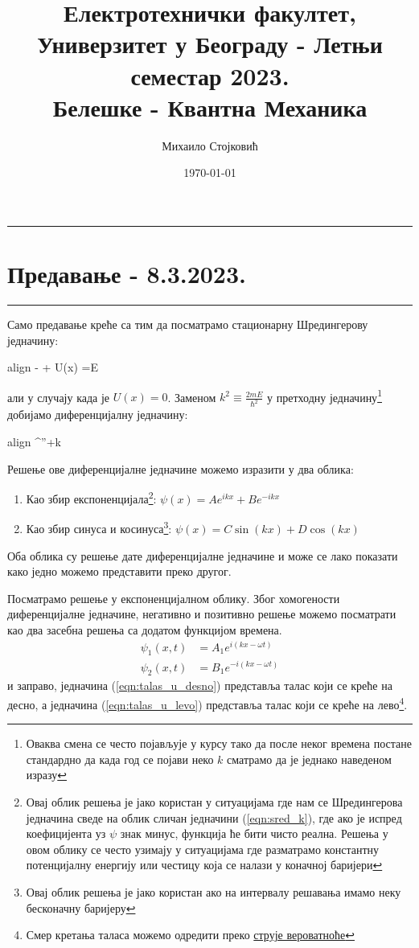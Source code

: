 \documentclass{tufte-handout} %
\title{	
	\normalfont\normalsize 
	{Електротехнички факултет, Универзитет у Београду - Летњи семестар 2023.} \\ [0pt] %
	\huge Белешке - Квантна Механика%
}\author{Михаило Стојковић} %
\date{\vspace{-5pt}\normalsize\today} %
\newcommand{\boxedeq}[1]{\begin{empheq}[box={\fboxsep=6pt\fbox}]{align} #1\end{empheq}}
\theoremstyle{definition}
\theoremstyle{remark}
\newcommand{\shreq}[2]{-\frac{\hb^2}{2m}\frac{\partial^2 #1}{\partial #2^2} + U(#2) #1 =E #1}
\newcommand{\kpsi}{\psi^{''}+k\psi=0}
\newcommand{\hb}{\hslash}
\begin{document}
\justifying 
\maketitle

\tableofcontents
\newpage
\vspace{1em}
\hrule
\section{Предавање - 8.3.2023.}
\hrule
\vspace{1em}
Само предавање креће са тим да посматрамо стационарну Шредингерову једначину:
	\boxedeq{\shreq{\psi}{x}}
али у случају када је $U(x)=0$. Заменом $k^2\equiv\frac{2mE}{\hslash^2}$ у претходну једначину\footnote{Оваква смена се често појављује у курсу тако да после неког времена постане стандардно да када год се појави неко $k$ сматрамо да је једнако наведеном изразу} добијамо диференцијалну једначину:
	\boxedeq{\label{eqn:sred_k}\kpsi}
Решење ове диференцијалне једначине можемо изразити у два облика:
\begin{enumerate}
	\item Као збир експоненцијала\footnote{Овај облик решења је јако користан у ситуацијама где нам се Шредингерова једначина сведе на облик сличан једначини (\ref{eqn:sred_k}), где ако је испред коефицијента уз $\psi$ знак минус, функција ће бити чисто реална. Решења у овом облику се често узимају у ситуацијама где разматрамо константну потенцијалну енергију или честицу која се налази у коначној баријери}: $\psi(x)=Ae^{ikx} + Be^{-ikx}$
	\item Као збир синуса и косинуса\footnote{Овај облик решења је јако користан ако на интервалу решавања имамо неку бесконачну баријеру}: $\psi(x)=C\sin(kx)+D\cos(kx)$
\end{enumerate}
Оба облика су решење дате диференцијалне једначине и може се лако показати како једно можемо представити преко другог.\par
Посматрамо решење у експоненцијалном облику. Због хомогености диференцијалне једначине, негативно и позитивно решење можемо посматрати као два засебна решења са додатом функцијом времена.
\begin{align}
	\label{eqn:talas_u_desno}\psi_1(x,t)&=A_1e^{i(kx-\omega t)}\\
	\label{eqn:talas_u_levo}\psi_2(x,t)&=B_1e^{-i(kx-\omega t)} 
\end{align}
и заправо, једначина (\ref{eqn:talas_u_desno}) представља талас који се креће на десно, а једначина (\ref{eqn:talas_u_levo}) представља талас који се креће на лево\footnote{Смер кретања таласа можемо одредити преко \hyperref[]{струје вероватноће}}.
\end{document}
